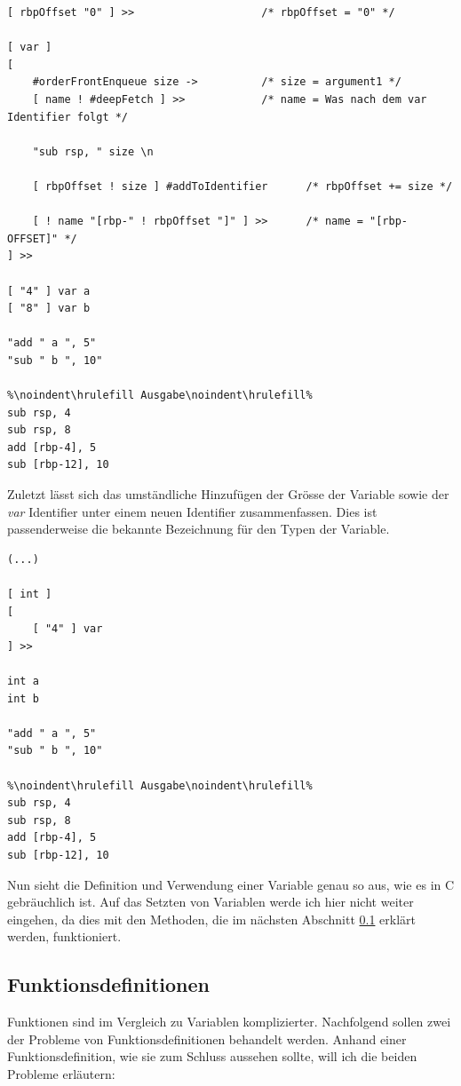 \begin{minipage}{\linewidth}
\begin{lstlisting}[language=QHS, label=eg:qhs-vardefinition, caption=Definition einer Variable mit rbpOffset]
[ rbpOffset "0" ] >>                    /* rbpOffset = "0" */

[ var ]
[
    #orderFrontEnqueue size ->          /* size = argument1 */
    [ name ! #deepFetch ] >>            /* name = Was nach dem var Identifier folgt */

    "sub rsp, " size \n

    [ rbpOffset ! size ] #addToIdentifier      /* rbpOffset += size */

    [ ! name "[rbp-" ! rbpOffset "]" ] >>      /* name = "[rbp-OFFSET]" */
] >> 

[ "4" ] var a 
[ "8" ] var b 

"add " a ", 5"
"sub " b ", 10"
    
%\noindent\hrulefill Ausgabe\noindent\hrulefill%
sub rsp, 4
sub rsp, 8
add [rbp-4], 5
sub [rbp-12], 10
\end{lstlisting}
\end{minipage}

Zuletzt lässt sich das umständliche Hinzufügen der Grösse der Variable sowie der \textit{var} Identifier unter einem neuen Identifier zusammenfassen. Dies ist passenderweise die bekannte Bezeichnung für den Typen der Variable.

\begin{lstlisting}[language=QHS, caption=Definition einer Variable mit \textit{int} Identifier] 
(...)

[ int ] 
[
    [ "4" ] var
] >>
    
int a 
int b 
    
"add " a ", 5"
"sub " b ", 10"
        
%\noindent\hrulefill Ausgabe\noindent\hrulefill%
sub rsp, 4
sub rsp, 8
add [rbp-4], 5
sub [rbp-12], 10
\end{lstlisting}

Nun sieht die Definition und Verwendung einer Variable genau so aus, wie es in C gebräuchlich ist.
Auf das Setzten von Variablen werde ich hier nicht weiter eingehen, da dies mit den Methoden, die im nächsten Abschnitt \ref{sec:qhs-funcs} erklärt werden, funktioniert.

\subsection{Funktionsdefinitionen} \label{sec:qhs-funcs}
Funktionen sind im Vergleich zu Variablen komplizierter. Nachfolgend sollen zwei der Probleme von Funktionsdefinitionen behandelt werden.
Anhand einer Funktionsdefinition, wie sie zum Schluss aussehen sollte, will ich die beiden Probleme erläutern:

